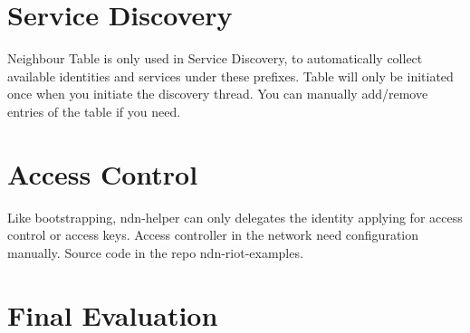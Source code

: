 \documentclass[a4paper, 11pt]{article}
\begin{document}
    \section*{Service Discovery}
    Neighbour Table is only used in Service Discovery, to automatically collect available identities and services under these prefixes. Table will only be initiated once when you initiate the discovery thread. You can manually add/remove entries of the table if you need.
    
    \section*{Access Control}
    Like bootstrapping, ndn-helper can only delegates the identity applying for access control or access keys. Access controller in the network need configuration manually. Source code in the repo ndn-riot-examples.
    
    \section*{Final Evaluation}
    \lipsum[7]
    
    
    
\end{document}
